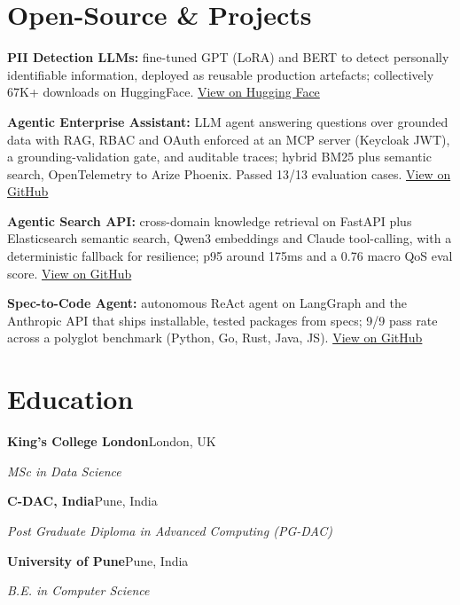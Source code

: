 \documentclass[10pt,a4paper]{article}
\begin{document}
\section{Open-Source \& Projects}
\begin{tight}
  \item \textbf{PII Detection LLMs:} fine-tuned GPT (LoRA) and BERT to detect personally identifiable information, deployed as reusable production artefacts; collectively 67K+ downloads on HuggingFace. \href{https://huggingface.co/ab-ai/pii_model}{View on Hugging Face}
  \item \textbf{Agentic Enterprise Assistant:} LLM agent answering questions over grounded data with RAG, RBAC and OAuth enforced at an MCP server (Keycloak JWT), a grounding-validation gate, and auditable traces; hybrid BM25 plus semantic search, OpenTelemetry to Arize Phoenix. Passed 13/13 evaluation cases. \href{https://github.com/abhijeetscode/Agentic-Enterprise-Assistant}{View on GitHub}
  \item \textbf{Agentic Search API:} cross-domain knowledge retrieval on FastAPI plus Elasticsearch semantic search, Qwen3 embeddings and Claude tool-calling, with a deterministic fallback for resilience; p95 around 175ms and a 0.76 macro QoS eval score. \href{https://github.com/abhijeetscode/search-agent}{View on GitHub}
  \item \textbf{Spec-to-Code Agent:} autonomous ReAct agent on LangGraph and the Anthropic API that ships installable, tested packages from specs; 9/9 pass rate across a polyglot benchmark (Python, Go, Rust, Java, JS). \href{https://github.com/abhijeetscode/Spec-to-Code-Agent}{View on GitHub}
\end{tight}

\section{Education}
{\color{company}\bfseries King's College London}\hfill {\color{muted}London, UK}\par
{\itshape MSc in Data Science}\par\vspace{2pt}
{\color{company}\bfseries C-DAC, India}\hfill {\color{muted}Pune, India}\par
{\itshape Post Graduate Diploma in Advanced Computing (PG-DAC)}\par\vspace{2pt}
{\color{company}\bfseries University of Pune}\hfill {\color{muted}Pune, India}\par
{\itshape B.E. in Computer Science}\par
\end{document}
